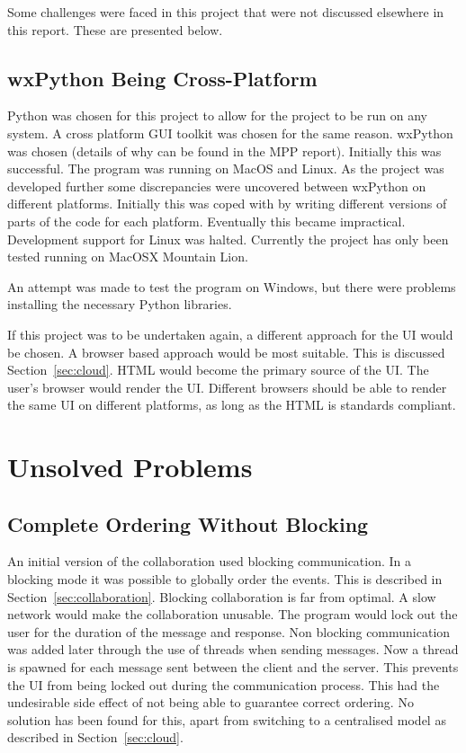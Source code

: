 Some challenges were faced in this project that were not discussed elsewhere in this report.  These are presented below.

\subsection{wxPython Being Cross-Platform}
Python was chosen for this project to allow for the project to be run on any system.  A cross platform \ac{GUI} toolkit was chosen for the same reason.  wxPython was chosen (details of why can be found in the MPP report).  Initially this was successful.  The program was running on MacOS and Linux.  As the project was developed further some discrepancies were uncovered between wxPython on different platforms.  Initially this was coped with by writing different versions of parts of the code for each platform.  Eventually this became impractical.  Development support for Linux was halted.  Currently the project has only been tested running on MacOSX Mountain Lion.

An attempt was made to test the program on Windows, but there were problems installing the necessary Python libraries.

If this project was to be undertaken again, a different approach for the \ac{UI} would be chosen.  A browser based approach would be most suitable.  This is discussed Section~\ref{sec:cloud}.  HTML would become the primary source of the \ac{UI}.  The user's browser would render the \ac{UI}.  Different browsers should be able to render the same \ac{UI} on different platforms, as long as the HTML is standards compliant.

\section{Unsolved Problems}

\subsection{Complete Ordering Without Blocking}
\label{sec:ordering}

An initial version of the collaboration used blocking communication.  In a blocking mode it was possible to globally order the events.  This is described in Section~\ref{sec:collaboration}.  Blocking collaboration is far from optimal.  A slow network would make the collaboration unusable.  The program would lock out the user for the duration of the message and response.  Non blocking communication was added later through the use of threads when sending messages.  Now a thread is spawned for each message sent between the client and the server.  This prevents the \ac{UI} from being locked out during the communication process.  This had the undesirable side effect of not being able to guarantee correct ordering.  No solution has been found for this, apart from switching to a centralised model as described in Section~\ref{sec:cloud}.

